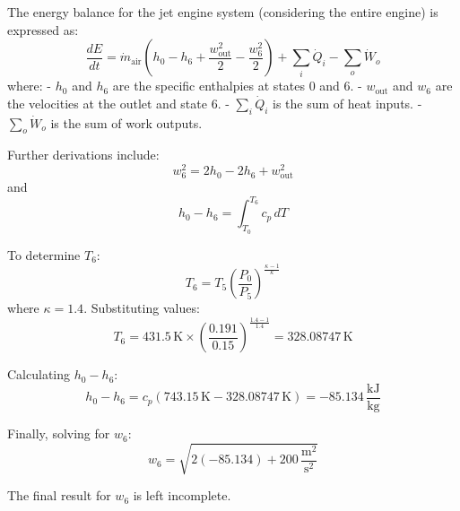 The energy balance for the jet engine system (considering the entire engine) is expressed as:  
\[
\frac{dE}{dt} = \dot{m}_{\text{air}} \left( h_0 - h_6 + \frac{w_{\text{out}}^2}{2} - \frac{w_6^2}{2} \right) + \sum_i \dot{Q}_i - \sum_o \dot{W}_o
\]  
where:  
- \( h_0 \) and \( h_6 \) are the specific enthalpies at states 0 and 6.  
- \( w_{\text{out}} \) and \( w_6 \) are the velocities at the outlet and state 6.  
- \( \sum_i \dot{Q}_i \) is the sum of heat inputs.  
- \( \sum_o \dot{W}_o \) is the sum of work outputs.  

Further derivations include:  
\[
w_6^2 = 2 h_0 - 2 h_6 + w_{\text{out}}^2
\]  
and  
\[
h_0 - h_6 = \int_{T_0}^{T_6} c_p \, dT
\]  

To determine \( T_6 \):  
\[
T_6 = T_5 \left( \frac{P_0}{P_5} \right)^{\frac{\kappa - 1}{\kappa}}
\]  
where \( \kappa = 1.4 \). Substituting values:  
\[
T_6 = 431.5 \, \text{K} \times \left( \frac{0.191}{0.15} \right)^{\frac{1.4 - 1}{1.4}} = 328.08747 \, \text{K}
\]  

Calculating \( h_0 - h_6 \):  
\[
h_0 - h_6 = c_p (743.15 \, \text{K} - 328.08747 \, \text{K}) = -85.134 \, \frac{\text{kJ}}{\text{kg}}
\]  

Finally, solving for \( w_6 \):  
\[
w_6 = \sqrt{2 (-85.134) + 200 \, \frac{\text{m}^2}{\text{s}^2}}
\]  

The final result for \( w_6 \) is left incomplete.